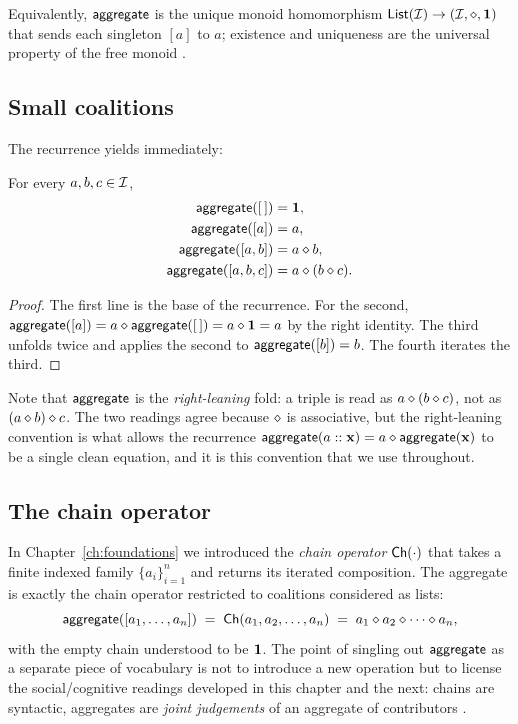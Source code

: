 Equivalently, $\mathsf{aggregate}$ is the unique monoid homomorphism
$\mathsf{List}(\mathcal{I}) \to (\mathcal{I},\mathbin{\diamond},\mathbf{1})$ that sends each singleton $[a]$ to $a$;
existence and uniqueness are the universal property of the free
monoid \cite{MacLane1998}.

\subsection*{Small coalitions}

The recurrence yields immediately:

\begin{lemma}\label{lem:small}
For every $a, b, c \in \mathcal{I}$,
\begin{align*}
  \mathsf{aggregate}([\,])     &= \mathbf{1},\\
  \mathsf{aggregate}([a])      &= a,\\
  \mathsf{aggregate}([a,b])    &= a \mathbin{\diamond} b,\\
  \mathsf{aggregate}([a,b,c])  &= a \mathbin{\diamond} (b \mathbin{\diamond} c).
\end{align*}
\end{lemma}

\begin{proof}
The first line is the base of the recurrence. For the second,
$\mathsf{aggregate}([a]) = a \mathbin{\diamond} \mathsf{aggregate}([\,]) = a \mathbin{\diamond} \mathbf{1} = a$
by the right identity. The third unfolds twice and applies the second
to $\mathsf{aggregate}([b]) = b$. The fourth iterates the third.
\end{proof}

Note that $\mathsf{aggregate}$ is the \emph{right-leaning} fold: a triple is
read as $a \mathbin{\diamond} (b \mathbin{\diamond} c)$, not as $(a \mathbin{\diamond} b) \mathbin{\diamond}
c$. The two readings agree because $\mathbin{\diamond}$ is associative, but the
right-leaning convention is what allows the recurrence
$\mathsf{aggregate}(a :: \mathbf{x}) = a \mathbin{\diamond} \mathsf{aggregate}(\mathbf{x})$ to be a single
clean equation, and it is this convention that we use throughout.

\subsection*{The chain operator}

In Chapter~\ref{ch:foundations} we introduced the \emph{chain
operator} $\mathsf{Ch}(\cdot)$ that takes a finite indexed family
$\{a_i\}_{i=1}^{n}$ and returns its iterated composition. The
aggregate is exactly the chain operator restricted to coalitions
considered as lists:
\[
  \mathsf{aggregate}([a_1, \ldots, a_n]) \;=\; \mathsf{Ch}(a_1, a_2, \ldots, a_n)
  \;=\; a_1 \mathbin{\diamond} a_2 \mathbin{\diamond} \cdots \mathbin{\diamond} a_n,
\]
with the empty chain understood to be $\mathbf{1}$. The point of singling
out $\mathsf{aggregate}$ as a separate piece of vocabulary is not to introduce
a new operation but to license the social/cognitive readings developed
in this chapter and the next: chains are syntactic, aggregates are
\emph{joint judgements} of an aggregate of contributors
\cite{ListPettit2011}.

